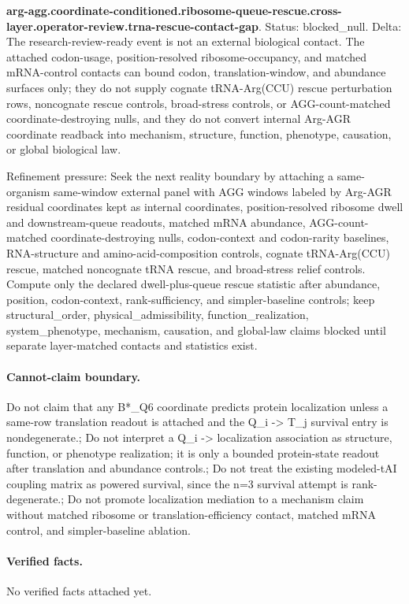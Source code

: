 \textbf{arg-agg.coordinate-conditioned.ribosome-queue-rescue.cross-layer.operator-review.trna-rescue-contact-gap}. Status: blocked\_null. Delta: The research-review-ready event is not an external biological contact. The attached codon-usage, position-resolved ribosome-occupancy, and matched mRNA-control contacts can bound codon, translation-window, and abundance surfaces only; they do not supply cognate tRNA-Arg(CCU) rescue perturbation rows, noncognate rescue controls, broad-stress controls, or AGG-count-matched coordinate-destroying nulls, and they do not convert internal Arg-AGR coordinate readback into mechanism, structure, function, phenotype, causation, or global biological law.

Refinement pressure: Seek the next reality boundary by attaching a same-organism same-window external panel with AGG windows labeled by Arg-AGR residual coordinates kept as internal coordinates, position-resolved ribosome dwell and downstream-queue readouts, matched mRNA abundance, AGG-count-matched coordinate-destroying nulls, codon-context and codon-rarity baselines, RNA-structure and amino-acid-composition controls, cognate tRNA-Arg(CCU) rescue, matched noncognate tRNA rescue, and broad-stress relief controls. Compute only the declared dwell-plus-queue rescue statistic after abundance, position, codon-context, rank-sufficiency, and simpler-baseline controls; keep structural\_order, physical\_admissibility, function\_realization, system\_phenotype, mechanism, causation, and global-law claims blocked until separate layer-matched contacts and statistics exist.

\paragraph{Cannot-claim boundary.} Do not claim that any B*\_Q6 coordinate predicts protein localization unless a same-row translation readout is attached and the Q\_i -> T\_j survival entry is nondegenerate.; Do not interpret a Q\_i -> localization association as structure, function, or phenotype realization; it is only a bounded protein-state readout after translation and abundance controls.; Do not treat the existing modeled-tAI coupling matrix as powered survival, since the n=3 survival attempt is rank-degenerate.; Do not promote localization mediation to a mechanism claim without matched ribosome or translation-efficiency contact, matched mRNA control, and simpler-baseline ablation.

\paragraph{Verified facts.}
No verified facts attached yet.

